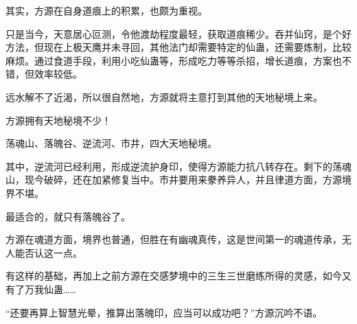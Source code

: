 \begin{this_body}
其实，方源在自身道痕上的积累，也颇为重视。

只是当今，天意居心叵测，令他渡劫程度最轻，获取道痕稀少。吞并仙窍，是个好方法，但现在上极天鹰并未寻回，其他法门却需要特定的仙蛊，还需要炼制，比较麻烦。通过食道手段，利用小吃仙蛊等，形成吃力等等杀招，增长道痕，方案也不错，但效率较低。

远水解不了近渴，所以很自然地，方源就将主意打到其他的天地秘境上来。

方源拥有天地秘境不少！

荡魂山、落魄谷、逆流河、市井，四大天地秘境。

其中，逆流河已经利用，形成逆流护身印，使得方源能力抗八转存在。剩下的荡魂山，现今破碎，还在加紧修复当中。市井要用来豢养异人，并且律道方面，方源境界不堪。

最适合的，就只有落魄谷了。

方源在魂道方面，境界也普通，但胜在有幽魂真传，这是世间第一的魂道传承，无人能否认这一点。

有这样的基础，再加上之前方源在交感梦境中的三生三世磨练所得的灵感，如今又有了万我仙蛊……

“还要再算上智慧光晕，推算出落魄印，应当可以成功吧？”方源沉吟不语。

\end{this_body}

